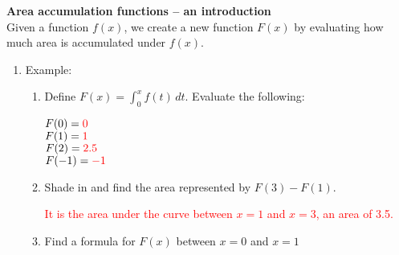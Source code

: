\documentclass[letterpaper,11pt]{article}
\def\ds{\displaystyle}
\newcommand{\sol}[1]{\textcolor{red}{#1}}
\newcommand{\sol}[1]{\textcolor{white}{#1}}
\begin{document}


{\large \textbf{Area accumulation functions -- an introduction}} \\
Given a function $f(x)$, we create a new function $F(x)$ by evaluating how much area is accumulated under $f(x)$.

\begin{enumerate}
\item Example:

\vspace{-.2 in}
\begin{center}
\end{center}

\begin{enumerate}

\vspace{-.1 in}
\item Define $\ds F(x)=\int_0^x f(t) \,dt$. Evaluate the following:

\begin{multicols}{2}
$F(0)= \sol{0}$  \\
$F(1)= \sol{1} $ \\

$F(2)= \sol{2.5} $  \\
$F(-1)= \sol{-1}$  \\
\end{multicols}

\vspace{-.2 in}
\item Shade in and find the area represented by $F(3)-F(1)$.

\sol{It is the area under the curve between $x=1$ and $x=3$, an area of 3.5.}
\vfill

\item Find a formula for $F(x)$ between $x=0$ and $x=1$


\end{enumerate}
\end{enumerate}
\end{document}

